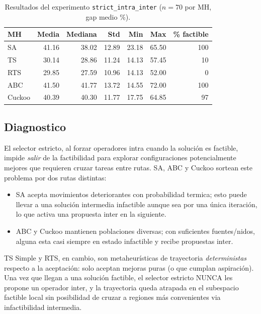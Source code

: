 \begin{table}[h]
\centering
\caption{Resultados del experimento \texttt{strict\_intra\_inter}
($n = 70$ por MH, gap medio \%).}
\label{tab:strict-resultados}
\small
\begin{tabular}{lrrrrrr}
\toprule
MH & Media & Mediana & Std & Min & Max & \% factible \\
\midrule
SA      & 41.16 & 38.02 & 12.89 & 23.18 & 65.50 & 100 \\
TS      & 30.14 & 28.86 & 11.24 & 14.13 & 57.45 &  10 \\
RTS     & 29.85 & 27.59 & 10.96 & 14.13 & 52.00 &   0 \\
ABC     & 41.50 & 41.77 & 13.72 & 14.55 & 72.00 & 100 \\
Cuckoo  & 40.39 & 40.30 & 11.77 & 17.75 & 64.85 &  97 \\
\bottomrule
\end{tabular}
\end{table}

\subsection{Diagnostico}

El selector estricto, al forzar operadores intra cuando la solución es
factible, impide \emph{salir} de la factibilidad para explorar
configuraciones potencialmente mejores que requieren cruzar tareas
entre rutas. SA, ABC y Cuckoo sortean este problema por dos rutas
distintas:

\begin{itemize}
\item SA acepta movimientos deteriorantes con probabilidad termica;
  esto puede llevar a una solución intermedia infactible aunque sea
  por una única iteración, lo que activa una propuesta inter en la
  siguiente.
\item ABC y Cuckoo mantienen poblaciones diversas; con suficientes
  fuentes/nidos, alguna esta casi siempre en estado infactible y
  recibe propuestas inter.
\end{itemize}

TS Simple y RTS, en cambio, son metaheurísticas de trayectoria
\emph{deterministas} respecto a la aceptación: solo aceptan mejoras
puras (o que cumplan aspiración). Una vez que llegan a una solución
factible, el selector estricto NUNCA les propone un operador inter, y
la trayectoria queda atrapada en el subespacio factible local sin
posibilidad de cruzar a regiones más convenientes via infactibilidad
intermedia.


